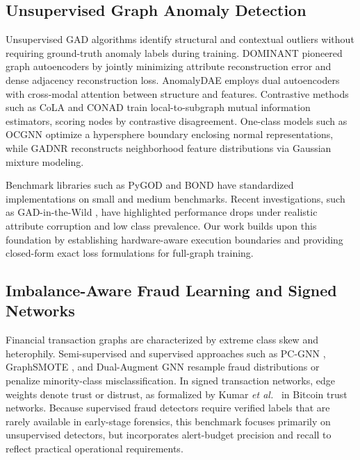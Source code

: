 \documentclass[applsci,article,submit,moreauthors,pdftex]{Definitions/mdpi}
\newcommand{\etal}{\emph{et al.}}
\begin{document}
\subsection{Unsupervised Graph Anomaly Detection}
Unsupervised GAD algorithms identify structural and contextual outliers without requiring ground-truth anomaly labels during training. DOMINANT \cite{ding2019deep} pioneered graph autoencoders by jointly minimizing attribute reconstruction error and dense adjacency reconstruction loss. AnomalyDAE \cite{fan2020anomalydae} employs dual autoencoders with cross-modal attention between structure and features. Contrastive methods such as CoLA \cite{liu2022cola} and CONAD \cite{xu2022conad} train local-to-subgraph mutual information estimators, scoring nodes by contrastive disagreement. One-class models such as OCGNN \cite{wang2021ocgnn} optimize a hypersphere boundary enclosing normal representations, while GADNR \cite{roy2024gadnr} reconstructs neighborhood feature distributions via Gaussian mixture modeling. 

Benchmark libraries such as PyGOD \cite{liu2024pygod} and BOND \cite{liu2022bond} have standardized implementations on small and medium benchmarks. Recent investigations, such as GAD-in-the-Wild \cite{zhou2026wild}, have highlighted performance drops under realistic attribute corruption and low class prevalence. Our work builds upon this foundation by establishing hardware-aware execution boundaries and providing closed-form exact loss formulations for full-graph training.

\subsection{Imbalance-Aware Fraud Learning and Signed Networks}
Financial transaction graphs are characterized by extreme class skew and heterophily. Semi-supervised and supervised approaches such as PC-GNN \cite{liu2021pcgnn}, GraphSMOTE \cite{zhao2021graphsmote}, and Dual-Augment GNN \cite{li2022dualaugment} resample fraud distributions or penalize minority-class misclassification. In signed transaction networks, edge weights denote trust or distrust, as formalized by Kumar \etal\ \cite{kumar2016edge} in Bitcoin trust networks. Because supervised fraud detectors require verified labels that are rarely available in early-stage forensics, this benchmark focuses primarily on unsupervised detectors, but incorporates alert-budget precision and recall to reflect practical operational requirements.
\end{document}
